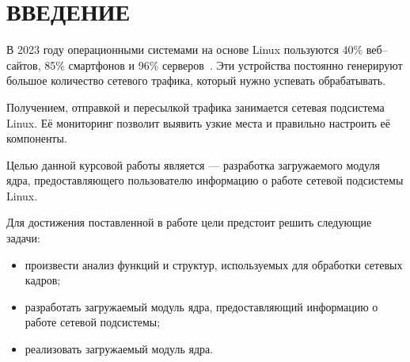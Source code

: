 \chapter*{ВВЕДЕНИЕ}

В 2023 году операционными системами на основе Linux пользуются 40\% веб--сайтов, 85\% смартфонов и 96\% серверов~\cite{stats}. Эти устройства постоянно генерируют большое количество сетевого трафика, который нужно успевать обрабатывать.

Получением, отправкой и пересылкой трафика занимается сетевая подсистема Linux. Её мониторинг позволит выявить узкие места и правильно настроить её компоненты.

Целью данной курсовой работы является --- разработка загружаемого модуля ядра, предоставляющего пользователю информацию о работе сетевой подсистемы Linux.

Для достижения поставленной в работе цели предстоит решить следующие задачи:
\begin{itemize}[label=---]
	\item произвести анализ функций и структур, используемых для обработки сетевых кадров;
	\item разработать загружаемый модуль ядра, предоставляющий информацию о работе сетевой подсистемы;
	\item реализовать загружаемый модуль ядра.
\end{itemize}
